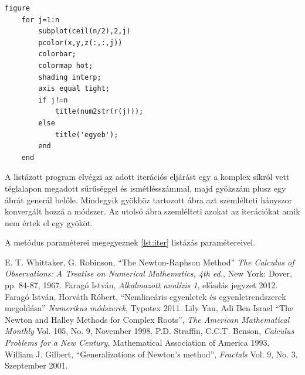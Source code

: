 \documentclass[a4paper,12pt]{report}
\begin{document}
\begin{appendices}
\begin{lstlisting}[caption=KonvergenciaAbraKomplex.m]
    figure
    for j=1:n
        subplot(ceil(n/2),2,j)
        pcolor(x,y,z(:,:,j))
        colorbar;
        colormap hot;
        shading interp;
        axis equal tight;
        if j!=n
            title(num2str(r(j)));
        else
            title('egyeb');
        end
    end
			\end{lstlisting}
			A listázott program elvégzi az adott iterációs eljárást egy a komplex síkról vett téglalapon megadott sűrűséggel és ismétlésszámmal, majd gyökszám plusz egy ábrát generál belőle. Mindegyik gyökhöz tartozott ábra azt szemlélteti hányszor konvergált hozzá a módszer. Az utolsó ábra szemlélteti azokat az iterációkat amik nem értek el egy gyököt.

			A metódus paraméterei megegyeznek \ref{lst:iter} listázás paramétereivel.
\end{appendices}

	\begin{thebibliography}{99}
    	 E. T. Whittaker, G. Robinson, ``The Newton-Raphson Method'' \emph{The Calculus of Observations: A Treatise on Numerical Mathematics, 4th ed.}, New York: Dover, pp. 84-87, 1967. 
		 Faragó István, \emph{Alkalmazott analízis 1}, előadás jegyzet 2012.
         Faragó István, Horváth Róbert, ``Nemlineáris egyenletek és egyenletrendszerek megoldása'' \emph{Numerikus módszerek}, Typotex 2011.
         Lily Yau, Adi Ben-Israel ``The Newton and Halley Methods for Complex Roots'', \emph{The American Mathematical Monthly} Vol. 105, No. 9, November 1998. %
		 P.D. Straffin, C.C.T. Benson, \emph{Calculus Problems for a New Century}, Mathematical Association of America 1993.
	 William J. Gilbert, ``Generalizations of Newton's method'', \emph{Fractals} Vol. 9, No. 3,  Szeptember 2001.

        
	\end{thebibliography}
\end{document}
